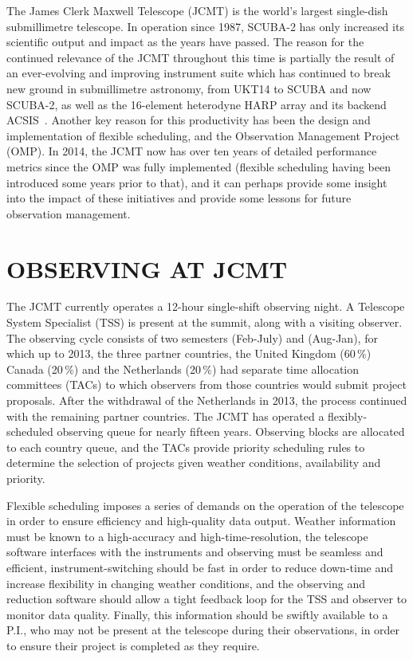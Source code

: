 \documentclass[]{spie}  %
\begin{document}
The James Clerk Maxwell Telescope (JCMT) is the world's largest
single-dish submillimetre telescope. In operation since 1987, SCUBA-2
has only increased its scientific output and impact as the years have
passed. The reason for the continued relevance of the JCMT throughout
this time is partially the result of an ever-evolving and improving
instrument suite which has continued to break new ground in
submillimetre astronomy, from UKT14\cite{1990MNRAS.243..126D} to SCUBA\cite{holland1999}
and now SCUBA-2\cite{holland2013}, as well as the 16-element heterodyne
HARP array\cite{buckle} and its backend ACSIS~\cite{2000SPIE.4015..114H}. Another key
reason for this productivity has been the design and implementation of
flexible scheduling\cite{1998SPIE.3349..126W,tilanus2000,robson2002}, and the Observation
Management Project (OMP)\cite{economou2002}.  In 2014, the JCMT now
has over ten years of detailed performance metrics since the OMP was
fully implemented (flexible scheduling having been introduced some
years prior to that), and it can perhaps provide some insight into the
impact of these initiatives and provide some lessons for future
observation management.


\section{OBSERVING AT JCMT}

The JCMT currently operates a 12-hour single-shift observing night. A
Telescope System Specialist (TSS) is present at the summit, along with
a visiting observer. The observing cycle consists of two semesters
(Feb-July) and (Aug-Jan), for which up to 2013, the three partner
countries, the United Kingdom (60\,$\%$) Canada (20\,$\%$) and the
Netherlands (20\,$\%$) had separate time allocation committees (TACs) to
which observers from those countries would submit project
proposals. After the withdrawal of the Netherlands in 2013, the
process continued with the remaining partner countries. The JCMT has
operated a flexibly-scheduled observing queue for nearly fifteen
years. Observing blocks are allocated to each country queue, and the
TACs provide priority scheduling rules to determine the selection of
projects given weather conditions, availability and priority.

Flexible scheduling imposes a series of demands on the operation of
the telescope in order to ensure efficiency and high-quality data
output. Weather information must be known to a high-accuracy and
high-time-resolution, the telescope software interfaces with the
instruments and observing must be seamless and efficient,
instrument-switching should be fast in order to reduce down-time and
increase flexibility in changing weather conditions, and the observing
and reduction software should allow a tight feedback loop for the TSS
and observer to monitor data quality. Finally, this information should
be swiftly available to a P.I., who may not be present at the telescope
during their observations, in order to ensure their project is
completed as they require.
\end{document}

